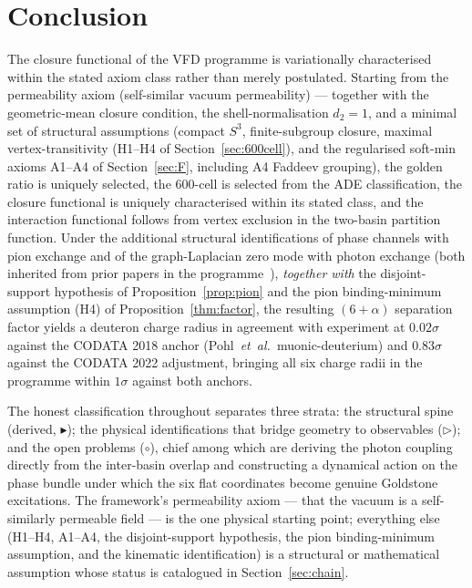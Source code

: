 \documentclass[12pt]{article}
\begin{document}
\section{Conclusion}\label{sec:conclusion}

The closure functional of the VFD programme is variationally characterised within the stated axiom class rather than merely postulated. Starting from the permeability axiom (self-similar vacuum permeability) --- together with the geometric-mean closure
condition, the shell-normalisation $d_2 = 1$, and a minimal set of structural assumptions (compact
$S^3$, finite-subgroup closure, maximal vertex-transitivity (H1--H4 of Section~\ref{sec:600cell}), and the regularised soft-min axioms A1--A4 of Section~\ref{sec:F}, including A4 Faddeev grouping), the golden ratio is
uniquely selected, the 600-cell is selected from the ADE
classification, the closure functional is uniquely characterised
within its stated class, and the interaction functional follows
from vertex exclusion in the two-basin partition function. Under
the additional structural identifications of phase channels with
pion exchange and of the graph-Laplacian zero mode with photon
exchange (both inherited from prior papers in the
programme~\citep{SmartRadius,SmartXXII}), \emph{together with} the disjoint-support hypothesis of Proposition~\ref{prop:pion} and the pion binding-minimum assumption (H4) of Proposition~\ref{thm:factor}, the resulting
$(6 + \alpha)$ separation factor yields a deuteron charge radius
in agreement with experiment at $0.02\sigma$ against the CODATA 2018 anchor (Pohl~\emph{et~al.}~muonic-deuterium) and $0.83\sigma$ against the CODATA 2022 adjustment, bringing all six charge radii in the programme within $1\sigma$ against both anchors.

The honest classification throughout separates three strata: the
structural spine (derived, $\blacktriangleright$); the physical
identifications that bridge geometry to observables
($\triangleright$); and the open problems ($\circ$), chief among
which are deriving the photon coupling directly from the
inter-basin overlap and constructing a dynamical action on the
phase bundle under which the six flat coordinates become genuine
Goldstone excitations. The framework's permeability axiom --- that the vacuum is a self-similarly permeable field --- is the one physical starting point; everything else (H1--H4, A1--A4, the disjoint-support hypothesis, the pion binding-minimum assumption, and the kinematic identification) is a structural or mathematical assumption whose status is catalogued in Section~\ref{sec:chain}.
\end{document}
